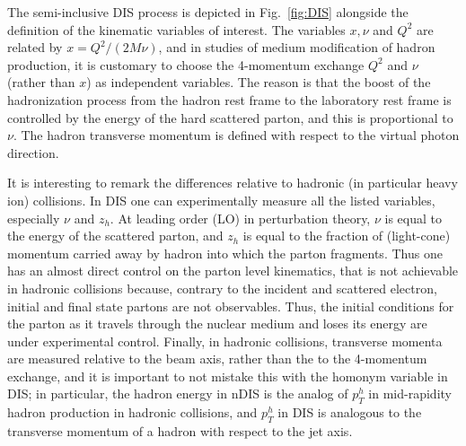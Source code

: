 The semi-inclusive DIS process is depicted in Fig.~\ref{fig:DIS} alongside the 
definition of the kinematic variables of interest. The variables $x,\nu$ and 
$Q^2$ are related by $x = Q^2/(2M\nu)$, and in studies of medium modification 
of hadron production, it is customary to choose the 4-momentum exchange $Q^2$ 
and $\nu$ (rather than $x$) as independent variables. The reason is that the 
boost of the hadronization process from the hadron rest frame to the laboratory 
rest frame is controlled by the energy of the hard scattered parton, and this 
is proportional to $\nu$. The hadron transverse momentum is defined with 
respect to the virtual photon direction.

It is interesting to remark the differences relative to hadronic (in particular 
heavy ion) collisions. In DIS one can experimentally measure all the listed 
variables, especially $\nu$ and $z_h$. At leading order (LO) in perturbation 
theory, $\nu$ is equal to the energy of the scattered parton, and $z_h$ is 
equal to the fraction of (light-cone) momentum carried away by hadron into 
which the parton fragments. Thus one has an almost direct control on the parton 
level kinematics, that is not achievable in hadronic collisions because, 
contrary to the incident and scattered electron, initial and final state 
partons are not observables. Thus, the initial conditions for the parton as it 
travels through the nuclear medium and loses its energy are under experimental 
control. Finally, in hadronic collisions, transverse momenta are measured 
relative to the beam axis, rather than the to the 4-momentum exchange, and it 
is important to not mistake this with the homonym variable in DIS; in 
particular, the hadron energy in nDIS is the analog of $p_T^h$ in mid-rapidity 
hadron production in hadronic collisions, and $p_T^h$ in DIS is analogous to 
the transverse momentum of a hadron with respect to the jet axis. 

